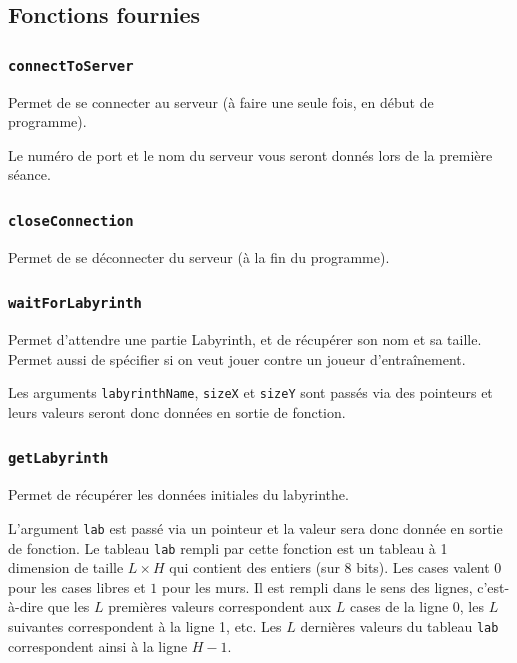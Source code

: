 \documentclass[french,12pt,a4paper,twoside,openright,titlepage]{report}
\begin{document}
\subsection{Fonctions fournies}
 
\subsubsection{\texttt{connectToServer}}
Permet de se connecter au serveur (à faire une seule fois, en début de programme).

Le numéro de port et le nom du serveur vous seront donnés lors de la première séance.



\subsubsection{\texttt{closeConnection}}
Permet de se déconnecter du serveur (à la fin du programme).



\subsubsection{\texttt{waitForLabyrinth}}
Permet d'attendre une partie Labyrinth, et de récupérer son nom et sa taille. Permet aussi de spécifier si on veut jouer contre un joueur d'entraînement.
\label{sec:wait}

Les arguments \texttt{labyrinthName}, \texttt{sizeX} et \texttt{sizeY} sont passés via des pointeurs et leurs valeurs
seront donc données en sortie de fonction.


\subsubsection{\texttt{getLabyrinth}}
Permet de récupérer les données initiales du labyrinthe.
\label{sec:getlab}

L'argument \texttt{lab} est passé via un pointeur et 
la valeur sera donc donnée en sortie de fonction. Le tableau \texttt{lab} rempli par cette
fonction est un tableau à 1 dimension de taille $L\times H$ qui contient des entiers (sur 8 bits). Les cases valent $0$ pour les cases libres et $1$ pour les murs. Il est rempli dans le sens des lignes, c'est-à-dire que les $L$
premières valeurs correspondent aux $L$ cases de la ligne 0, les $L$ suivantes correspondent à la ligne 1, etc.
Les $L$ dernières valeurs du tableau \verb|lab| correspondent ainsi à la ligne $H-1$.
\end{document}
